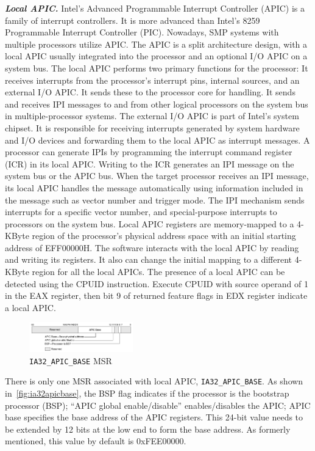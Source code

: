 \textbf{\textit{Local APIC.}} Intel's Advanced Programmable Interrupt Controller (APIC) is a family of interrupt controllers. It is more advanced than Intel's 8259 Programmable Interrupt Controller (PIC). Nowadays, SMP systems with multiple processors utilize APIC. The APIC is a split architecture design, with a local APIC usually integrated into the processor and an optional I/O APIC on a system bus. The local APIC performs two primary functions for the processor:
It receives interrupts from the processor's interrupt pins, internal sources, and an external I/O APIC. It sends these to the processor core for handling.
It sends and receives IPI messages to and from other logical processors on the system bus in multiple-processor systems.
The external I/O APIC is part of Intel's system chipset. It is responsible for receiving interrupts generated by system hardware and I/O devices and forwarding them to the local APIC as interrupt messages. A processor can generate IPIs by programming the interrupt command register (ICR) in its local APIC. Writing to the ICR generates an IPI message on the system bus or the APIC bus. When the target processor receives an IPI message, its local APIC handles the message automatically using information included in the message such as vector number and trigger mode. The IPI mechanism sends interrupts for a specific vector number, and special-purpose interrupts to processors on the system bus. Local APIC registers are memory-mapped to a 4-KByte region of the processor's physical address space with an initial starting address of EFF00000H. The software interacts with the local APIC by reading and writing its registers. It also can change the initial mapping to a different 4-KByte region for all the local APICs. The presence of a local APIC can be detected using the CPUID instruction. Execute CPUID with source operand of 1 in the EAX register, then bit 9 of returned feature flags in EDX register indicate a local APIC.


\begin{figure}[th]
  \includegraphics[width=0.40\textwidth]{figures/ia32apicbase}
  \centering
  \caption{\texttt{IA32\_APIC\_BASE} MSR}
  \label{fig:ia32apicbase}
\end{figure}

There is only one MSR associated with local APIC, \texttt{IA32\_APIC\_BASE}. As shown in~\autoref{fig:ia32apicbase}, the BSP flag indicates if the processor is the bootstrap processor (BSP); ``APIC global enable/disable'' enables/disables the APIC; APIC base specifies the base address of the APIC registers. This 24-bit value needs to be extended by 12 bits at the low end to form the base address. As formerly mentioned, this value by default is 0xFEE00000.

